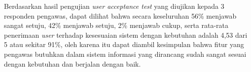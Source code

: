 Berdasarkan hasil pengujian \textit{user acceptance test} yang diujikan kepada 3 responden pengawas, dapat dilihat bahwa secara keseluruhan 56\% menjawab sangat setuju, 42\% menjawab setuju, 2\% menjawab cukup, serta rata-rata penerimaan \textit{user} terhadap kesesuaian sistem dengan kebutuhan adalah 4,53 dari 5 atau sekitar 91\%, oleh karena itu dapat diambil kesimpulan bahwa fitur yang pengawas butuhkan dalam sistem informasi yang dirancang sudah sangat sesuai dengan kebutuhan dan berjalan dengan baik. 

